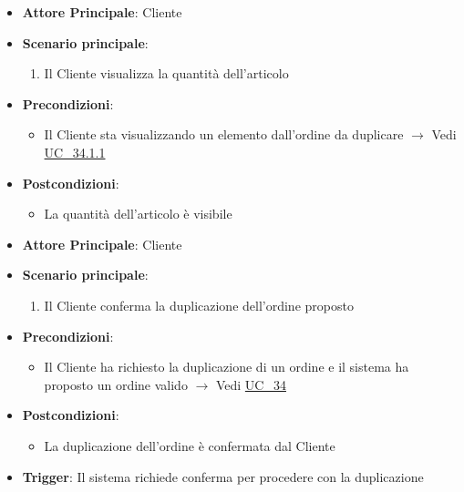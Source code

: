\label{uc_34.1.1.3}
\begin{itemize}
    \item \textbf{Attore Principale}: Cliente
	\item \textbf{Scenario principale}: 
	\begin{enumerate}
		\item Il Cliente visualizza la quantità dell'articolo
	\end{enumerate}
	\item \textbf{Precondizioni}: 
	\begin{itemize}
		\item Il Cliente sta visualizzando un elemento dall'ordine da duplicare $\rightarrow$ Vedi \hyperref[uc_34.1.1]{UC\_34.1.1}
	\end{itemize}
	\item \textbf{Postcondizioni}:
	\begin{itemize}
		\item La quantità dell'articolo è visibile
	\end{itemize} 
\end{itemize}

\label{uc_34.2}

\begin{itemize}
    \item \textbf{Attore Principale}: Cliente
	\item \textbf{Scenario principale}:
	\begin{enumerate}
		\item Il Cliente conferma la duplicazione dell'ordine proposto
	\end{enumerate}
	\item \textbf{Precondizioni}:
	\begin{itemize}
		\item Il Cliente ha richiesto la duplicazione di un ordine e il sistema ha proposto un ordine valido $\rightarrow$ Vedi \hyperref[uc_34]{UC\_34}
	\end{itemize}
	\item \textbf{Postcondizioni}:
	\begin{itemize}
		\item La duplicazione dell'ordine è confermata dal Cliente
	\end{itemize}
	\item \textbf{Trigger}: Il sistema richiede conferma per procedere con la duplicazione
\end{itemize}